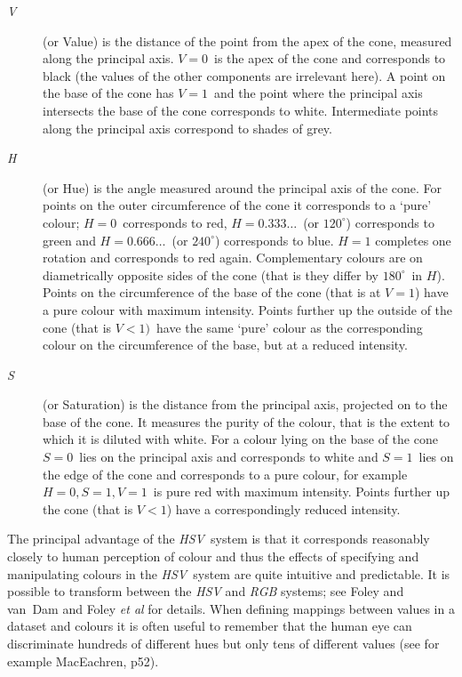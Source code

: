 \begin{description}

  \item[{\it V}] (or Value) is the distance of the point from the
   apex of the cone, measured along the principal axis. $V=0$\, is the
   apex of the cone and corresponds to black (the values of the other
   components are irrelevant here). A point on the base of the cone has
   $V=1$\, and the point where the principal axis intersects the base
   of the cone corresponds to white. Intermediate points along the
   principal axis correspond to shades of grey.

  \item[{\it H}] (or Hue) is the angle measured around the principal
   axis of the cone. For points on the outer circumference of the
   cone it corresponds to a `pure' colour; $H=0$\, corresponds to red,
   $H=0.333\ldots$\, (or $120^{\circ}$) corresponds to green and
   $H=0.666\ldots$\, (or $240^{\circ}$) corresponds to blue. $H=1$
   completes one rotation and corresponds to red again. Complementary
   colours are on diametrically opposite sides of the cone (that is
   they differ by $180^{\circ}$\, in $H$). Points on the circumference of
   the base of the cone (that is at $V=1$) have a pure colour with maximum
   intensity. Points further up the outside of the cone (that is $V<1)$\,
   have the same `pure' colour as the corresponding colour on the
   circumference of the base, but at a reduced intensity.

  \item[{\it S}] (or Saturation) is the distance from the principal
   axis, projected on to the base of the cone. It measures the purity
   of the colour, that is the extent to which it is diluted with white.
   For a colour lying on the base of the cone $S=0$\, lies on the
   principal axis and corresponds to white and $S=1$\, lies on the edge
   of the cone and corresponds to a pure colour, for example $H=0,
   S=1, V=1$\, is pure red with maximum intensity. Points further up the
   cone (that is $V<1$) have a correspondingly reduced intensity.

\end{description}

The principal advantage of the {\it HSV}\, system is that it
corresponds reasonably closely to human perception of colour and thus
the effects of specifying and manipulating colours in the {\it HSV}\,
system are quite intuitive and predictable. It is possible to transform
between the {\it HSV} and {\it RGB} systems; see Foley and 
van~Dam\cite{FOLEY1} and Foley {\it et al}\cite{FOLEY2} for details.
When defining mappings between values in a dataset and colours it is
often useful to remember that the human eye can discriminate hundreds
of different hues but only tens of different values (see for example
MacEachren\cite{MACEACHREN}, p52).


